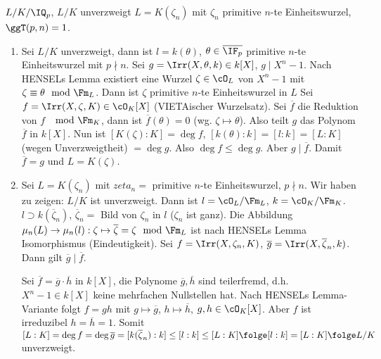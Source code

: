 \begin{Fakt}
 $L/K/\IQ_p$, $L/K$ unverzweigt \gdw $L=K(\zeta_n)$ mit $\zeta_n$ primitive $n$-te Einheitswurzel, $\ggT(p,n)=1$.
\end{Fakt}

\begin{Beweis}
 \begin{enumerate}
  \item Sei $L/K$ unverzweigt, dann ist $l=k(\theta)$, $\theta\in\overline{\IF_p}$ primitive $n$-te Einheitswurzel mit $p\nmid n$.
  Sei $g=\Irr(X,\theta,k)\in k[X]$, $g\mid X^n-1$.  Nach HENSELs Lemma existiert eine Wurzel $\zeta\in\cO_L$ von $X^n-1$ mit $\zeta\equiv \theta \mod{\Fm_L}$. Dann ist $\zeta$ primitive $n$-te Einheitswurzel in $L$
  Sei $f=\Irr(X,\zeta,K)\in\cO_K[X]$ (VIETAischer Wurzelsatz). Sei $\overline{f}$ die Reduktion von $f$ $\mod{\Fm_K}$, dann ist $\overline f(\theta)=0$ (wg. $\zeta\mapsto \theta$). Also teilt $g$ das Polynom $\overline f$ in $k[X]$. Nun ist $[K(\zeta):K]=\deg f$, $[k(\theta):k]=[l:k]=[L:K]$ (wegen Unverzweigtheit) $=\deg g$. Also $\deg f \leq \deg g$. Aber $g\mid \overline{f}$. Damit $\overline f = g$ und $L=K(\zeta)$.
  \item Sei $L=K(\zeta_n)$ mit $zeta_n = $ primitive $n$-te Einheitswurzel, $p\nmid n$. Wir haben zu zeigen: $L/K$ ist unverzweigt. 
  Dann ist $l=\cO_L/\Fm_L$, $k=\cO_K/\Fm_K$. $l\supset k(\overline\zeta_n)$, $\overline{\zeta}_n=$ Bild von $\zeta_n$ in $l$ ($\zeta_n$ ist ganz).
  Die Abbildung $\mu_n(L)\rightarrow \mu_n(l): \zeta\mapsto \overline{\zeta}=\zeta\mod{\Fm_L}$ ist nach HENSELs Lemma Isomorphismus (Eindeutigkeit). Sei $f=\Irr(X,\zeta_n,K)$, $\overline g=\Irr(X,\overline\zeta_n,k)$. Dann gilt $\overline{g}\mid\overline{f}$.
  
  Sei $\overline{f}=\overline{g}\cdot \overline h$ in $k[X]$, die Polynome $\overline g, \overline h$ sind teilerfremd, d.h. $X^n-1\in k[X]$ keine mehrfachen Nullstellen hat. Nach HENSELs Lemma-Variante folgt $f=gh$ mit $g\mapsto \overline{g}$, $h\mapsto \overline{h}$, $g,h\in\cO_K[X]$. Aber $f$ ist irreduzibel \folge $h=\overline{h}=1$. Somit $[L:K]=\deg f=\deg \overline{g}=[k(\overline\zeta_n):k]\leq [l:k]\leq [L:K] \folge [l:k]=[L:K]\folge L/K$ unverzweigt.
 \end{enumerate}
\end{Beweis}

